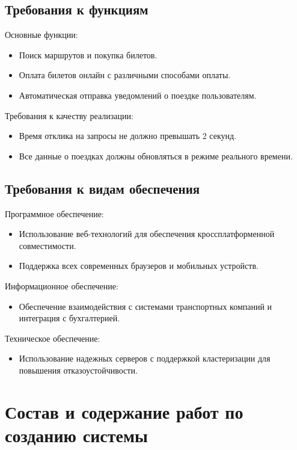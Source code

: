 \subsection{Требования к функциям}

\noindent Основные функции:
\begin{itemize}
    \item Поиск маршрутов и покупка билетов.
    \item Оплата билетов онлайн с различными способами оплаты.
    \item Автоматическая отправка уведомлений о поездке пользователям.
\end{itemize}

\noindent Требования к качеству реализации:
\begin{itemize}
    \item Время отклика на запросы не должно превышать 2 секунд.
    \item Все данные о поездках должны обновляться в режиме реального времени.
\end{itemize}

\subsection{Требования к видам обеспечения}

\noindent Программное обеспечение:
\begin{itemize}
    \item Использование веб-технологий для обеспечения кроссплатформенной
    совместимости.
    \item Поддержка всех современных браузеров и мобильных устройств.
\end{itemize}

\noindent Информационное обеспечение:
\begin{itemize}
    \item Обеспечение взаимодействия с системами транспортных компаний и
    интеграция с бухгалтерией.
\end{itemize}

\noindent Техническое обеспечение:
\begin{itemize}
    \item Использование надежных серверов с поддержкой кластеризации для
    повышения отказоустойчивости.
\end{itemize}

\section{Состав и содержание работ по созданию системы}

